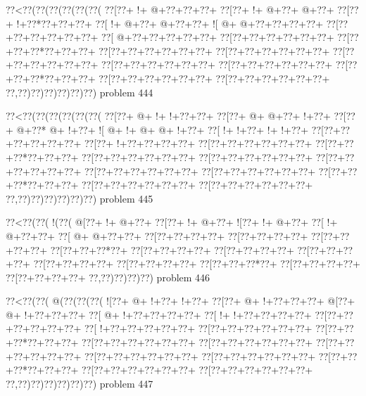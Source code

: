 \vbox{\vbox{\goo
\0??<\0??(\0??(\0??(\0??(\0??(\0??(
\0??[\0??+\- !+\- @+\0??+\0??+\0??+
\0??[\0??+\- !+\- @+\0??+\- @+\0??+
\0??[\0??+\- !+\0??*\0??+\0??+\0??+
\0??[\- !+\- @+\0??+\- @+\0??+\0??+
\- ![\- @+\- @+\0??+\0??+\0??+\0??+
\0??[\0??+\0??+\0??+\0??+\0??+\0??+
\0??[\- @+\0??+\0??+\0??+\0??+\0??+
\0??[\0??+\0??+\0??+\0??+\0??+\0??+
\0??[\0??+\0??+\0??*\0??+\0??+\0??+
\0??[\0??+\0??+\0??+\0??+\0??+\0??+
\0??[\0??+\0??+\0??+\0??+\0??+\0??+
\0??[\0??+\0??+\0??+\0??+\0??+\0??+
\0??[\0??+\0??+\0??+\0??+\0??+\0??+
\0??[\0??+\0??+\0??+\0??+\0??+\0??+
\0??[\0??+\0??+\0??*\0??+\0??+\0??+
\0??[\0??+\0??+\0??+\0??+\0??+\0??+
\0??[\0??+\0??+\0??+\0??+\0??+\0??+
\0??,\0??)\0??)\0??)\0??)\0??)\0??)
}
\hfil problem 444\hfil\break
}

\vbox{\vbox{\goo
\0??<\0??(\0??(\0??(\0??(\0??(\0??(
\0??[\0??+\- @+\- !+\- !+\0??+\0??+
\0??[\0??+\- @+\- @+\0??+\- !+\0??+
\0??[\0??+\- @+\0??*\- @+\- !+\0??+
\- ![\- @+\- !+\- @+\- @+\- !+\0??+
\0??[\- !+\- !+\0??+\- !+\- !+\0??+
\0??[\0??+\0??+\0??+\0??+\0??+\0??+
\0??[\0??+\- !+\0??+\0??+\0??+\0??+
\0??[\0??+\0??+\0??+\0??+\0??+\0??+
\0??[\0??+\0??+\0??*\0??+\0??+\0??+
\0??[\0??+\0??+\0??+\0??+\0??+\0??+
\0??[\0??+\0??+\0??+\0??+\0??+\0??+
\0??[\0??+\0??+\0??+\0??+\0??+\0??+
\0??[\0??+\0??+\0??+\0??+\0??+\0??+
\0??[\0??+\0??+\0??+\0??+\0??+\0??+
\0??[\0??+\0??+\0??*\0??+\0??+\0??+
\0??[\0??+\0??+\0??+\0??+\0??+\0??+
\0??[\0??+\0??+\0??+\0??+\0??+\0??+
\0??,\0??)\0??)\0??)\0??)\0??)\0??)
}
\hfil problem 445\hfil\break
}

\vbox{\vbox{\goo
\0??<\0??(\0??(\- !(\0??(
\- @[\0??+\- !+\- @+\0??+
\0??[\0??+\- !+\- @+\0??+
\- ![\0??+\- !+\- @+\0??+
\0??[\- !+\- @+\0??+\0??+
\0??[\- @+\- @+\0??+\0??+
\0??[\0??+\0??+\0??+\0??+
\0??[\0??+\0??+\0??+\0??+
\0??[\0??+\0??+\0??+\0??+
\0??[\0??+\0??+\0??*\0??+
\0??[\0??+\0??+\0??+\0??+
\0??[\0??+\0??+\0??+\0??+
\0??[\0??+\0??+\0??+\0??+
\0??[\0??+\0??+\0??+\0??+
\0??[\0??+\0??+\0??+\0??+
\0??[\0??+\0??+\0??*\0??+
\0??[\0??+\0??+\0??+\0??+
\0??[\0??+\0??+\0??+\0??+
\0??,\0??)\0??)\0??)\0??)
}
\hfil problem 446\hfil\break
}

\vbox{\vbox{\goo
\0??<\0??(\0??(\- @(\0??(\0??(\0??(
\- ![\0??+\- @+\- !+\0??+\- !+\0??+
\0??[\0??+\- @+\- !+\0??+\0??+\0??+
\- @[\0??+\- @+\- !+\0??+\0??+\0??+
\0??[\- @+\- !+\0??+\0??+\0??+\0??+
\0??[\- !+\- !+\0??+\0??+\0??+\0??+
\0??[\0??+\0??+\0??+\0??+\0??+\0??+
\0??[\- !+\0??+\0??+\0??+\0??+\0??+
\0??[\0??+\0??+\0??+\0??+\0??+\0??+
\0??[\0??+\0??+\0??*\0??+\0??+\0??+
\0??[\0??+\0??+\0??+\0??+\0??+\0??+
\0??[\0??+\0??+\0??+\0??+\0??+\0??+
\0??[\0??+\0??+\0??+\0??+\0??+\0??+
\0??[\0??+\0??+\0??+\0??+\0??+\0??+
\0??[\0??+\0??+\0??+\0??+\0??+\0??+
\0??[\0??+\0??+\0??*\0??+\0??+\0??+
\0??[\0??+\0??+\0??+\0??+\0??+\0??+
\0??[\0??+\0??+\0??+\0??+\0??+\0??+
\0??,\0??)\0??)\0??)\0??)\0??)\0??)
}
\hfil problem 447\hfil\break
}

